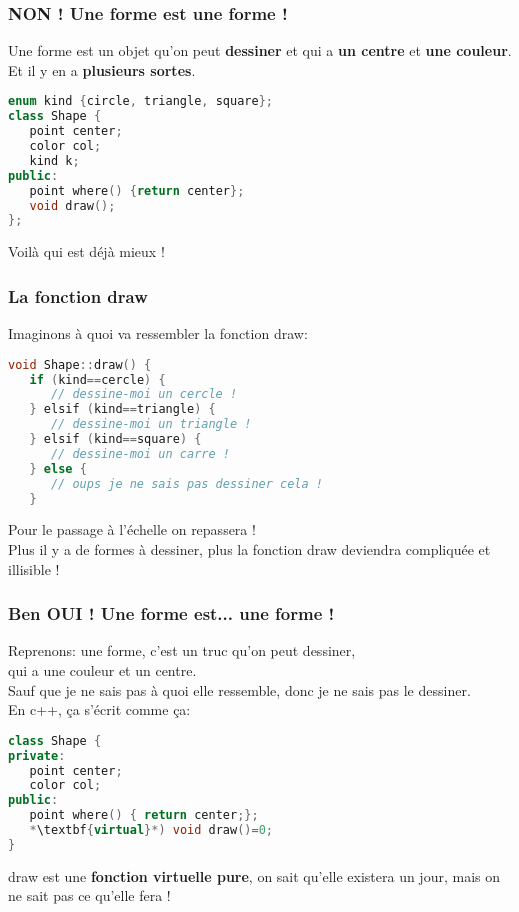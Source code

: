 \documentclass{beamer}
\begin{document}
  \begin{frame}[fragile=singleslide,shrink=20]
  \frametitle{NON ! Une forme est une forme !}
  Une forme est un objet qu'on peut \textbf{dessiner} et qui a \textbf{un centre} et \textbf{une couleur}.\\
  Et il y en a \textbf{plusieurs sortes}.
\begin{lstlisting}[language=c++]
enum kind {circle, triangle, square};
class Shape {
   point center;
   color col;
   kind k;
public:
   point where() {return center};
   void draw();
};
\end{lstlisting}
Voilà qui est déjà mieux ! 
\end{frame}

  \begin{frame}[fragile=singleslide,shrink=20]
  \frametitle{La fonction draw}
  Imaginons à quoi va ressembler la fonction draw:
\begin{lstlisting}[language=c++]
void Shape::draw() {
   if (kind==cercle) {
      // dessine-moi un cercle !
   } elsif (kind==triangle) {
      // dessine-moi un triangle !
   } elsif (kind==square) {
      // dessine-moi un carre !
   } else {
      // oups je ne sais pas dessiner cela !
   }
\end{lstlisting}
Pour le passage à l'échelle on repassera ! \\
Plus il y a de formes à dessiner, plus la fonction draw deviendra compliquée et illisible !

\end{frame}
  
  \begin{frame}[fragile=singleslide,shrink=20]
  \frametitle{Ben OUI ! Une forme est... une forme !}
Reprenons: une forme, c'est un truc qu'on peut dessiner, \\ qui a une couleur et un centre. \\
Sauf que je ne sais pas à quoi elle ressemble, donc je ne sais pas le dessiner. \\
En c++, ça s'écrit comme ça:

\begin{lstlisting}[language=c++]
class Shape {
private:
   point center;
   color col;
public:
   point where() { return center;};
   *\textbf{virtual}*) void draw()=0;
}
\end{lstlisting}

draw est une \textbf{fonction virtuelle pure}, on sait qu'elle existera un jour, mais on ne sait pas ce qu'elle fera !

\end{frame}
\end{document}
